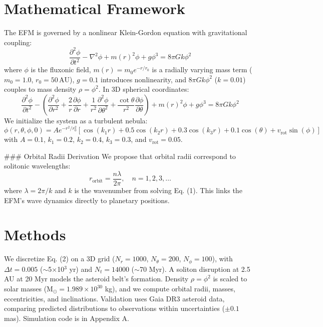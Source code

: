 \documentclass[11pt]{article}
\begin{document}
\section{Mathematical Framework}
The EFM is governed by a nonlinear Klein-Gordon equation with gravitational coupling:
\begin{equation}
\frac{\partial^2 \phi}{\partial t^2} - \nabla^2 \phi + m(r)^2 \phi + g \phi^3 = 8\pi G k \phi^2
\end{equation}
where \(\phi\) is the fluxonic field, \(m(r) = m_0 e^{-r/r_0}\) is a radially varying mass term (\(m_0 = 1.0\), \(r_0 = 50 \, \text{AU}\)), \(g = 0.1\) introduces nonlinearity, and \(8\pi G k \phi^2\) (\(k = 0.01\)) couples to mass density \(\rho = \phi^2\). In 3D spherical coordinates:
\begin{equation}
\frac{\partial^2 \phi}{\partial t^2} - \left( \frac{\partial^2 \phi}{\partial r^2} + \frac{2}{r} \frac{\partial \phi}{\partial r} + \frac{1}{r^2} \frac{\partial^2 \phi}{\partial \theta^2} + \frac{\cot\theta}{r^2} \frac{\partial \phi}{\partial \theta} \right) + m(r)^2 \phi + g \phi^3 = 8\pi G k \phi^2
\end{equation}
We initialize the system as a turbulent nebula:
\begin{equation}
\phi(r, \theta, \phi, 0) = A e^{-r^2 / r_0^2} \left[ \cos(k_1 r) + 0.5 \cos(k_2 r) + 0.3 \cos(k_3 r) + 0.1 \cos(\theta) + v_{\text{rot}} \sin(\phi) \right]
\end{equation}
with \(A = 0.1\), \(k_1 = 0.2\), \(k_2 = 0.4\), \(k_3 = 0.3\), and \(v_{\text{rot}} = 0.05\).

### Orbital Radii Derivation
We propose that orbital radii correspond to solitonic wavelengths:
\begin{equation}
r_{\text{orbit}} = \frac{n \lambda}{2\pi}, \quad n = 1, 2, 3, \dots
\end{equation}
where \(\lambda = 2\pi / k\) and \(k\) is the wavenumber from solving Eq. (1). This links the EFM’s wave dynamics directly to planetary positions.

\section{Methods}
We discretize Eq. (2) on a 3D grid (\(N_r = 1000\), \(N_\theta = 200\), \(N_\phi = 100\)), with \(\Delta t = 0.005\) ($\sim$5$\times$10$^3$ yr) and \(N_t = 14000\) ($\sim$70 Myr). A soliton disruption at 2.5 AU at 20 Myr models the asteroid belt’s formation. Density \(\rho = \phi^2\) is scaled to solar masses (M$_\odot = 1.989 \times 10^{30}$ kg), and we compute orbital radii, masses, eccentricities, and inclinations. Validation uses Gaia DR3 asteroid data, comparing predicted distributions to observations within uncertainties (\(\pm 0.1\) mas). Simulation code is in Appendix A.
\end{document}
